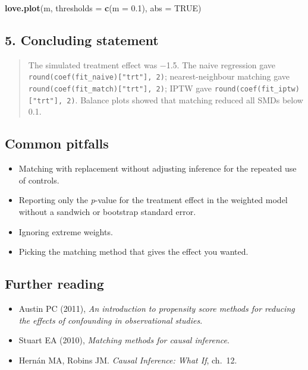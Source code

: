 \documentclass[
]{article}
\newenvironment{Shaded}{\begin{snugshade}}{\end{snugshade}}
\newcommand{\AttributeTok}[1]{\textcolor[rgb]{0.13,0.29,0.53}{#1}}
\newcommand{\ConstantTok}[1]{\textcolor[rgb]{0.56,0.35,0.01}{#1}}
\newcommand{\FloatTok}[1]{\textcolor[rgb]{0.00,0.00,0.81}{#1}}
\newcommand{\FunctionTok}[1]{\textcolor[rgb]{0.13,0.29,0.53}{\textbf{#1}}}
\newcommand{\NormalTok}[1]{#1}
\providecommand{\tightlist}{%
  \setlength{\itemsep}{0pt}\setlength{\parskip}{0pt}}
\begin{document}
\begin{Shaded}
\begin{Highlighting}[]
\FunctionTok{love.plot}\NormalTok{(m, }\AttributeTok{thresholds =} \FunctionTok{c}\NormalTok{(}\AttributeTok{m =} \FloatTok{0.1}\NormalTok{), }\AttributeTok{abs =} \ConstantTok{TRUE}\NormalTok{)}
\end{Highlighting}
\end{Shaded}

\subsection{5. Concluding statement}\label{concluding-statement}

\begin{quote}
The simulated treatment effect was −1.5. The naive regression gave
\texttt{round(coef(fit\_naive){[}"trt"{]},\ 2)}; nearest-neighbour
matching gave \texttt{round(coef(fit\_match){[}"trt"{]},\ 2)}; IPTW gave
\texttt{round(coef(fit\_iptw){[}"trt"{]},\ 2)}. Balance plots showed
that matching reduced all SMDs below 0.1.
\end{quote}

\subsection{Common pitfalls}\label{common-pitfalls}

\begin{itemize}
\tightlist
\item
  Matching with replacement without adjusting inference for the repeated
  use of controls.
\item
  Reporting only the \emph{p}-value for the treatment effect in the
  weighted model without a sandwich or bootstrap standard error.
\item
  Ignoring extreme weights.
\item
  Picking the matching method that gives the effect you wanted.
\end{itemize}

\subsection{Further reading}\label{further-reading}

\begin{itemize}
\tightlist
\item
  Austin PC (2011), \emph{An introduction to propensity score methods
  for reducing the effects of confounding in observational studies}.
\item
  Stuart EA (2010), \emph{Matching methods for causal inference}.
\item
  Hernán MA, Robins JM. \emph{Causal Inference: What If}, ch.~12.
\end{itemize}
\end{document}
